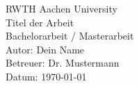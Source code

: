 \begin{center}
{\Large RWTH Aachen University}\\[2cm]
{\Huge Titel der Arbeit}\\[1cm]
{\large Bachelorarbeit / Masterarbeit}\\[2cm]
Autor: Dein Name\\
Betreuer: Dr. Mustermann\\
Datum: \today
\end{center}